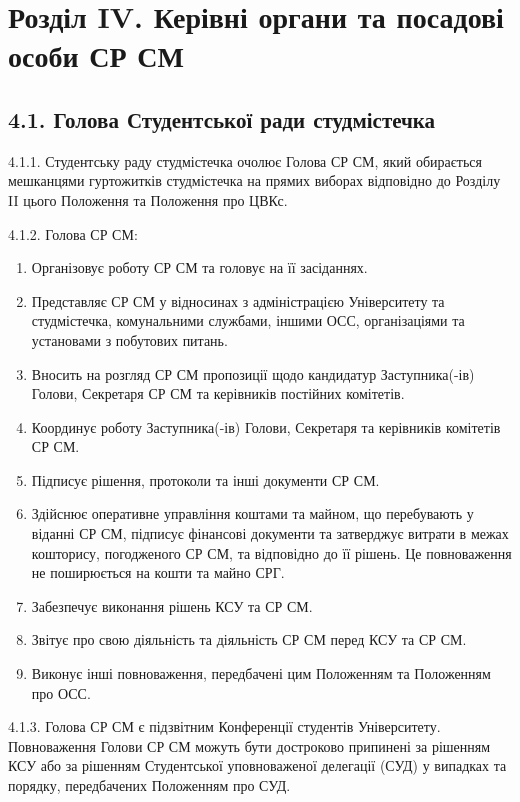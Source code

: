 \section*{Розділ IV. Керівні органи та посадові особи СР СМ}

\subsection*{4.1. Голова Студентської ради студмістечка}
    4.1.1. Студентську раду студмістечка очолює Голова СР СМ, який обирається мешканцями гуртожитків студмістечка на прямих виборах відповідно до Розділу II цього Положення та Положення про ЦВКс.

    4.1.2. Голова СР СМ:

        \begin{enumerate}[label=\alph*)]
            \item Організовує роботу СР СМ та головує на її засіданнях.
            \item Представляє СР СМ у відносинах з адміністрацією Університету та студмістечка, комунальними службами, іншими ОСС, організаціями та установами з побутових питань.
            \item Вносить на розгляд СР СМ пропозиції щодо кандидатур Заступника(-ів) Голови, Секретаря СР СМ та керівників постійних комітетів.
            \item Координує роботу Заступника(-ів) Голови, Секретаря та керівників комітетів СР СМ.
            \item Підписує рішення, протоколи та інші документи СР СМ.
            \item Здійснює оперативне управління коштами та майном, що перебувають у віданні СР СМ, підписує фінансові документи та затверджує витрати в межах кошторису, погодженого СР СМ, та відповідно до її рішень. Це повноваження не поширюється на кошти та майно СРГ.
            \item Забезпечує виконання рішень КСУ та СР СМ.
            \item Звітує про свою діяльність та діяльність СР СМ перед КСУ та СР СМ.
            \item Виконує інші повноваження, передбачені цим Положенням та Положенням про ОСС.
        \end{enumerate}

    4.1.3. Голова СР СМ є підзвітним Конференції студентів Університету. Повноваження Голови СР СМ можуть бути достроково припинені за рішенням КСУ або за рішенням Студентської уповноваженої делегації (СУД) у випадках та порядку, передбачених Положенням про СУД.


